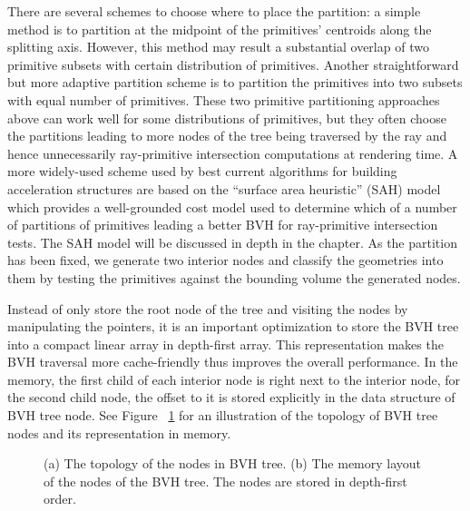 There are several schemes to choose where to place the partition: a simple method is to partition at the midpoint of the primitives' centroids along the splitting axis. However, this method may result a substantial overlap of two primitive subsets with certain distribution of primitives. Another straightforward but more adaptive partition scheme is to partition the primitives into two subsets with equal number of primitives. These two primitive partitioning approaches above can work well for some distributions of primitives, but they often choose the partitions leading to more nodes of the tree being traversed by the ray and hence unnecessarily ray-primitive intersection computations at rendering time. A more widely-used scheme used by best current algorithms for building acceleration structures are based on the ``surface area heuristic''  (SAH) model which provides a well-grounded cost model used to determine which of a number of partitions of primitives leading a better BVH for ray-primitive intersection tests. The SAH model will be discussed in depth in the chapter. As the partition has been fixed, we generate two interior nodes and classify the geometries into them by testing the primitives against the bounding volume the generated nodes.

Instead of only store the root node of the tree and visiting the nodes by manipulating the pointers, it is an important optimization to store the BVH tree into a compact linear array in depth-first array. This representation makes the BVH traversal more cache-friendly thus improves the overall performance. In the memory, the first child of each interior node is right next to the interior node, for the second child node, the offset to it is stored explicitly in the data structure of BVH tree node. See Figure ~\ref{fig:bvh_linear_layout} for an illustration of the topology of BVH tree nodes and its representation in memory.   

\begin{figure}[htp] 
	\centering 
	\renewcommand{\thefigure}{\thechapter.\arabic{figure}}
	\caption[Linear Layout of a BVH in memory]{(a) The topology of the nodes in BVH tree. (b) The memory layout of the nodes of the BVH tree. The nodes are stored in depth-first order.}
	\label{fig:bvh_linear_layout}
\end{figure}

